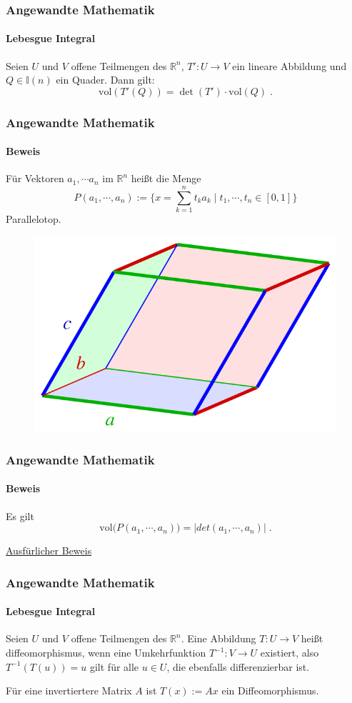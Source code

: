 \documentclass{beamer}
\begin{document}
\begin{frame}
    \frametitle{Angewandte Mathematik}
\framesubtitle{Lebesgue Integral}
\begin{block}{}
Seien $U$ und $V$ offene Teilmengen des $\mathbb{R}^n$, $T': U \to V$ ein lineare Abbildung und  $Q \in \mathbb{I}(n)$ ein Quader.
Dann gilt:
 $$ \text{vol}  (T'(Q))   =  \det (T') \cdot   \text{vol}(Q) \; .$$
\end{block}
 \end{frame}

\begin{frame}
    \frametitle{Angewandte Mathematik}
\framesubtitle{Beweis}
Für Vektoren $a_1, \cdots a_n$ im $\mathbb{R}^n$ heißt die Menge 
$$ P(a_1, \cdots,  a_n) := \biggl \{  x = \sum_{k=1}^n t_k a_k  \; | \; t_1, \cdots , t_n \in [0,1]  \biggr \}$$
Parallelotop.
\begin{figure}[H]
      \centering
    \includegraphics[width=0.6 \textwidth]{images/640px-Parallelepiped-0}    
\end{figure}
 \end{frame}

\begin{frame}
    \frametitle{Angewandte Mathematik}
\framesubtitle{Beweis}

Es gilt  $$  \text{vol} \bigr( P(a_1, \cdots, a_n) \bigr) =  | det (a_1, \cdots, a_n) |   \; .$$

\href{https://www.math.uchicago.edu/~may/VIGRE/VIGRE2007/REUPapers/FINALAPP/Peng.pdf}{Ausfürlicher Beweis}
 \end{frame}



\begin{frame}
    \frametitle{Angewandte Mathematik}
\framesubtitle{Lebesgue Integral}
\begin{block}{}
Seien $U$ und $V$ offene Teilmengen des $\mathbb{R}^n$. Eine Abbildung  $T: U \to V$ heißt diffeomorphismus, wenn eine  Umkehrfunktion $T^{-1}: V  \to U$ existiert, also $T^{-1} (T (u)) = u$ gilt für alle $u \in U$, die ebenfalls differenzierbar ist.
\end{block}

\begin{block}{}
Für eine invertiertere Matrix $A$ ist $T(x):= Ax$ ein Diffeomorphismus.
\end{block}
 \end{frame}
\end{document}
